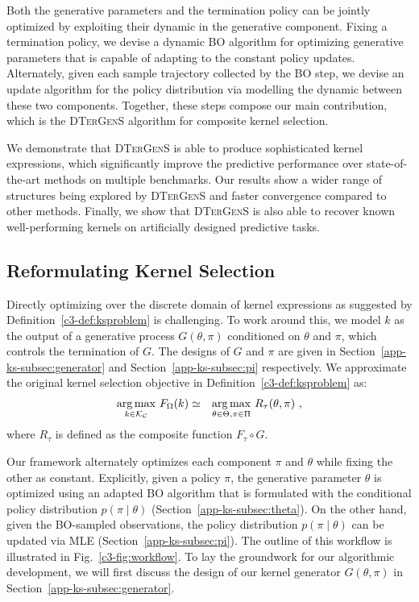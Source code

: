 Both the generative parameters and the termination policy can be jointly optimized by exploiting their dynamic in the generative component. Fixing a termination policy, we devise a dynamic BO algorithm for optimizing generative parameters that is capable of adapting to the constant policy updates. Alternately, given each sample trajectory collected by the BO step, we devise an update algorithm for the policy distribution via modelling the dynamic between these two components. Together, these steps compose our main contribution, which is the \textsc{DTerGenS} algorithm for composite kernel selection. 

We demonstrate that \textsc{DTerGenS} is able to produce sophisticated kernel expressions, which significantly improve the predictive performance over state-of-the-art methods on multiple benchmarks. Our results show a wider range of structures being explored by \textsc{DTerGenS} and faster convergence compared to other methods. Finally, we show that \textsc{DTerGenS} is also able to recover known well-performing kernels on artificially designed predictive tasks.

\subsection{Reformulating Kernel Selection}
\label{app-ks-subsec:reformulation}
Directly optimizing over the discrete domain of kernel expressions as suggested by Definition~\ref{c3-def:ksproblem} is challenging. To work around this, we model $k$ as the output of a generative process $G(\theta, \pi)$ conditioned on $\theta$ and $\pi$, which controls the termination of $G$. The designs of $G$ and $\pi$ are given in Section~\ref{app-ks-subsec:generator} and Section~\ref{app-ks-subsec:pi} respectively. We approximate the original kernel selection objective in Definition~\ref{c3-def:ksproblem} as:
\begin{eqnarray}
\underset{k \in \mathcal{K_C}}{\argmax} \ F_{\Omega}(k) &\simeq&  \underset{\theta \in \Theta, \pi \in \Pi}{\argmax} \ R_{\tau} (\theta, \pi) \ ,
\label{app-ks-prop:reformulation}
\end{eqnarray}
where $R_\tau$ is defined as the composite function $F_\tau \circ G$.

\noindent Our framework alternately optimizes each component $\pi$ and $\theta$ while fixing the other as constant. Explicitly, given a policy $\pi$, the generative parameter $\theta$ is optimized using an adapted BO algorithm that is formulated with the conditional policy distribution $p(\pi \mid \theta)$ (Section~\ref{app-ks-subsec:theta}). On the other hand, given the BO-sampled observations, the policy distribution $p(\pi \mid \theta)$ can be updated via MLE (Section~\ref{app-ks-subsec:pi}). The outline of this workflow is illustrated in Fig.~\ref{c3-fig:workflow}. To lay the groundwork for our algorithmic development, we will first discuss the design of our kernel generator $G(\theta, \pi)$ in Section~\ref{app-ks-subsec:generator}.

